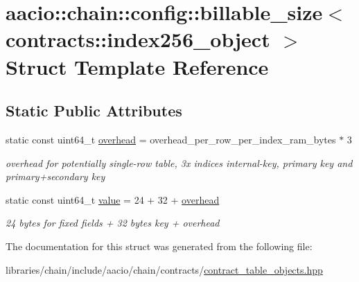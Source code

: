 \hypertarget{structaacio_1_1chain_1_1config_1_1billable__size_3_01contracts_1_1index256__object_01_4}{}\section{aacio\+:\+:chain\+:\+:config\+:\+:billable\+\_\+size$<$ contracts\+:\+:index256\+\_\+object $>$ Struct Template Reference}
\label{structaacio_1_1chain_1_1config_1_1billable__size_3_01contracts_1_1index256__object_01_4}
\subsection*{Static Public Attributes}
\begin{DoxyCompactItemize}
\item 
\mbox{\label{structaacio_1_1chain_1_1config_1_1billable__size_3_01contracts_1_1index256__object_01_4_a8cd27a665398d95825594202c606f557}} 
static const uint64\+\_\+t \mbox{\hyperlink{structaacio_1_1chain_1_1config_1_1billable__size_3_01contracts_1_1index256__object_01_4_a8cd27a665398d95825594202c606f557}{overhead}} = overhead\+\_\+per\+\_\+row\+\_\+per\+\_\+index\+\_\+ram\+\_\+bytes $\ast$ 3
\begin{DoxyCompactList}\small\item\em overhead for potentially single-\/row table, 3x indices internal-\/key, primary key and primary+secondary key \end{DoxyCompactList}\item 
\mbox{\label{structaacio_1_1chain_1_1config_1_1billable__size_3_01contracts_1_1index256__object_01_4_a5736b74597d76c8d2fb1b412202edc04}} 
static const uint64\+\_\+t \mbox{\hyperlink{structaacio_1_1chain_1_1config_1_1billable__size_3_01contracts_1_1index256__object_01_4_a5736b74597d76c8d2fb1b412202edc04}{value}} = 24 + 32 + \mbox{\hyperlink{structaacio_1_1chain_1_1config_1_1billable__size_3_01contracts_1_1index256__object_01_4_a8cd27a665398d95825594202c606f557}{overhead}}
\begin{DoxyCompactList}\small\item\em 24 bytes for fixed fields + 32 bytes key + overhead \end{DoxyCompactList}\end{DoxyCompactItemize}


The documentation for this struct was generated from the following file\+:\begin{DoxyCompactItemize}
\item 
libraries/chain/include/aacio/chain/contracts/\mbox{\hyperlink{contract__table__objects_8hpp}{contract\+\_\+table\+\_\+objects.\+hpp}}\end{DoxyCompactItemize}
